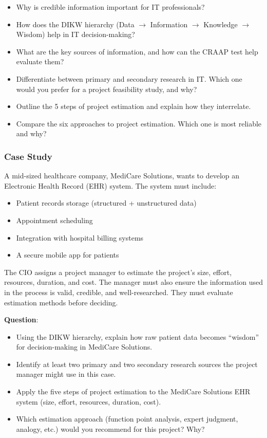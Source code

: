 \begin{itemize}
    \item Why is credible information important for IT professionals?
    \item How does the DIKW hierarchy (Data $\xrightarrow{}$ Information $\xrightarrow{}$ Knowledge $\xrightarrow{}$ Wisdom) help in IT decision-making?
    \item What are the key sources of information, and how can the CRAAP test help evaluate them?
    \item Differentiate between primary and secondary research in IT. Which one would you prefer for a project feasibility study, and why?
    \item Outline the 5 steps of project estimation and explain how they interrelate.
    \item Compare the six approaches to project estimation. Which one is most reliable and why?
\end{itemize}

\subsubsection{Case Study}

\indent 

A mid-sized healthcare company, MediCare Solutions, wants to develop an Electronic Health Record (EHR) system. The system must include:

\begin{itemize}
    \item Patient records storage (structured + unstructured data)
    \item Appointment scheduling
    \item Integration with hospital billing systems
    \item A secure mobile app for patients
\end{itemize}

The CIO assigns a project manager to estimate the project’s size, effort, resources, duration, and cost. The manager must also ensure the information used in the process is valid, credible, and well-researched. They must evaluate estimation methods before deciding.

\bigskip

\noindent\textbf{Question}:

\begin{itemize}
    \item Using the DIKW hierarchy, explain how raw patient data becomes “wisdom” for decision-making in MediCare Solutions.
    \item Identify at least two primary and two secondary research sources the project manager might use in this case.
    \item Apply the five steps of project estimation to the MediCare Solutions EHR system (size, effort, resources, duration, cost).
    \item Which estimation approach (function point analysis, expert judgment, analogy, etc.) would you recommend for this project? Why?
\end{itemize}
